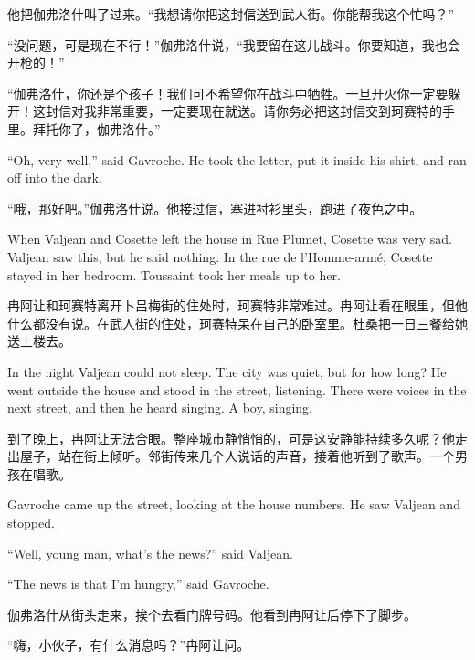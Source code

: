 \documentclass[fontset=ubuntu, zihao=5]{ctexart}
\begin{document}
\begin{paracol}{2}
他把伽弗洛什叫了过来。“我想请你把这封信送到武人街。你能帮我这个忙吗？”

“没问题，可是现在不行！”伽弗洛什说，“我要留在这儿战斗。你要知道，我也会开枪的！”

“伽弗洛什，你还是个孩子！我们可不希望你在战斗中牺牲。一旦开火你一定要躲开！这封信对我非常重要，一定要现在就送。请你务必把这封信交到珂赛特的手里。拜托你了，伽弗洛什。”

\switchcolumn*

``Oh, very well,'' said Gavroche. He took the letter, put it inside his shirt, and ran off into the dark.

\switchcolumn

“哦，那好吧。”伽弗洛什说。他接过信，塞进衬衫里头，跑进了夜色之中。

\switchcolumn*

\sectionbreak

When Valjean and Cosette left the house in Rue Plumet, Cosette was very sad. Valjean saw this, but he said nothing. In the rue de l'Homme-armé, Cosette stayed in her bedroom. Toussaint took her meals up to her.


\switchcolumn

\sectionbreak

冉阿让和珂赛特离开卜吕梅街的住处时，珂赛特非常难过。冉阿让看在眼里，但他什么都没有说。在武人街的住处，珂赛特呆在自己的卧室里。杜桑把一日三餐给她送上楼去。

\switchcolumn*

In the night Valjean could not sleep. The city was quiet, but for how long? He went outside the house and stood in the street, listening. There were voices in the next street, and then he heard singing. A boy, singing.

\switchcolumn

到了晚上，冉阿让无法合眼。整座城市静悄悄的，可是这安静能持续多久呢？他走出屋子，站在街上倾听。邻街传来几个人说话的声音，接着他听到了歌声。一个男孩在唱歌。

\switchcolumn*

Gavroche came up the street, looking at the house numbers. He saw Valjean and stopped.

``Well, young man, what's the news?'' said Valjean.


``The news is that I'm hungry,'' said Gavroche.

\switchcolumn

伽弗洛什从街头走来，挨个去看门牌号码。他看到冉阿让后停下了脚步。

“嗨，小伙子，有什么消息吗？”冉阿让问。


\end{paracol}
\end{document}
